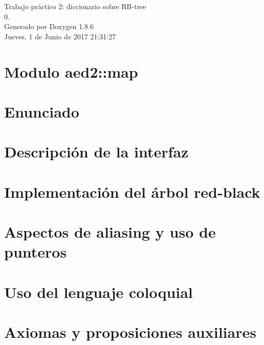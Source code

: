 \documentclass[twoside]{article}
\begin{document}
\hypersetup{pageanchor=false}
\begin{titlepage}
\vspace*{7cm}
\begin{center}%
{\Large Trabajo práctico 2\-: diccionario sobre R\-B-\/tree \\[1ex]\large 0. }\\
\vspace*{1cm}
{\large Generado por Doxygen 1.8.6}\\
\vspace*{0.5cm}
{\small Jueves, 1 de Junio de 2017 21:31:27}\\
\end{center}
\end{titlepage}
\tableofcontents
{}
\hypersetup{pageanchor=true}

\section{Modulo aed2\-:\-:map}
\label{index}\hypertarget{index}{}
\section{Enunciado}
\label{Enunciado}
\hypertarget{Enunciado}{}

\section{Descripción de la interfaz}
\label{Interfaz}
\hypertarget{Interfaz}{}

\section{Implementación del árbol red-\/black}
\label{Implementacion}
\hypertarget{Implementacion}{}

\section{Aspectos de aliasing y uso de punteros}
\label{Aliasing}
\hypertarget{Aliasing}{}

\section{Uso del lenguaje coloquial}
\label{Castellano}
\hypertarget{Castellano}{}

\section{Axiomas y proposiciones auxiliares}
\label{axiomas}
\hypertarget{axiomas}{}

\end{document}
